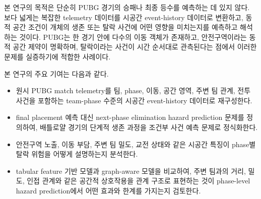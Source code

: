 본 연구의 목적은 단순히 PUBG 경기의 승패나 최종 등수를 예측하는 데 있지 않다. 보다 넓게는 복잡한 telemetry 데이터를 시공간 event-history 데이터로 변환하고, 동적 공간 조건이 개체의 생존 또는 탈락 사건에 어떤 영향을 미치는지를 예측하고 해석하는 것이다. PUBG는 한 경기 안에 다수의 이동 객체가 존재하고, 안전구역이라는 동적 공간 제약이 명확하며, 탈락이라는 사건이 시간 순서대로 관측된다는 점에서 이러한 문제를 실증하기에 적합한 사례이다.

본 연구의 주요 기여는 다음과 같다.

\begin{itemize}
  \item 원시 PUBG match telemetry를 팀, phase, 이동, 공간 영역, 주변 팀 관계, 전투 사건을 포함하는 team-phase 수준의 시공간 event-history 데이터로 재구성한다.
  \item final placement 예측 대신 next-phase elimination hazard prediction 문제를 정의하여, 배틀로얄 경기의 단계적 생존 과정을 조건부 사건 예측 문제로 정식화한다.
  \item 안전구역 노출, 이동 부담, 주변 팀 밀도, 교전 상태와 같은 시공간 특징이 phase별 탈락 위험을 어떻게 설명하는지 분석한다.
  \item tabular feature 기반 모델과 graph-aware 모델을 비교하여, 주변 팀과의 거리, 밀도, 인접 관계와 같은 공간적 상호작용을 관계 구조로 표현하는 것이 phase-level hazard prediction에서 어떤 효과와 한계를 가지는지 검토한다.
\end{itemize}
